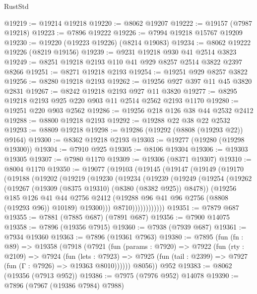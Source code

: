 \begin{lexlean}{RustStd}
\begin{coremodule}
@19219 := @19214 @19218
@19220 := @8062 @19207
@19222 := @19157 (@7987 @19218)
@19223 := @7896 @19222
@19226 := @7994 @19218 @15767 @19209
@19230 := @19220 (@19223 @19226) (@8214 @19083)
@19234 := @8062 @19222 @19226 (@8219 @19156)
@19239 := @9231 @19218 @930 @41 @2514 @3823
@19249 := @8251 @19218 @2193 @110 @41 @929 @8257 @2514 @3822 @2397 @8266
@19251 := @8271 @19218 @2193
@19254 := @19251 @929 @8257 @3822
@19256 := @8280 @19218 @2193
@19262 := @19256 @927 @397 @11 @45 @3820 @2831
@19267 := @8242 @19218 @2193 @927 @11 @3820
@19277 := @8295 @19218 @2193 @925 @220 @903 @11 @2514 @2562 @2193 @1170
@19280 := @19251 @220 @903 @2562
@19286 := @19256 @218 @126 @38 @44 @2532 @2412
@19288 := @8800 @19218 @2193
@19292 := @19288 @22 @38 @22 @2532
@19293 := @8809 @19218
@19298 := @19286 (@19292 (@8808 (@19293 @22)) @9164)
@19300 := @8362 @19218 @2193
@19303 := @19277 (@19280 (@19298 @19300))
@19304 := @7910 @925
@19305 := @8106 @19304
@19306 := @19303 @19305
@19307 := @7980 @1170
@19309 := @19306 (@8371 @19307)
@19310 := @8004 @1170
@19350 := @19077
    (@19103
      (@19145
        (@19147
          (@19149
            (@19170
              (@19188
                (@19202
                  (@19219
                    (@19230
                      (@19234
                        (@19239
                          (@19249
                            (@19254
                              (@19262
                                (@19267 (@19309 (@8375 @19310) (@8380 (@8382 @925)) @8478))
                                (@19256
                                  @185
                                  @126
                                  @41
                                  @44
                                  @2756
                                  @2412
                                  (@19288 @96 @41 @96 @2756 (@8808 (@19293 @96)) @10189)
                                  @19300)))
                            @8710))))))))))))
@19351 := @7879 @687
@19355 := @7881 (@7885 @687) (@7891 @687)
@19356 := @7900 @14075
@19358 := @7896 (@19356 @7915)
@19360 := @7938 (@7939 @687)
@19361 := @7934 @19360
@19363 := @7896 (@19361 @7963)
@19380 := @7895
    (fun (fn : @89) =>
    @19358
      (@7918
        (@7921
          (fun (params : @7920) =>
          @7922
            (fun (rty : @2109) =>
            @7924
              (fun (lets : @7923) =>
              @7925 (fun (tail : @2399) => @7927 (fun (Γ : @7926) => @19363 @8010))))))
        @8056))
    @952
@19383 := @8062 (@19356 (@7913 @952))
@19386 := @7975 (@7976 @952) @14078
@19390 := @7896 (@7967 (@19386 @7984) @7988)

\end{coremodule}
\end{lexlean}
